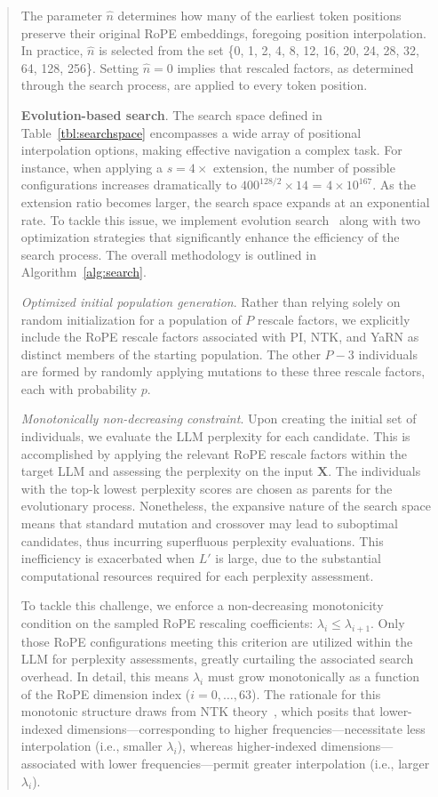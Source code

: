 \begin{abstract}
The parameter $\hat{n}$ determines how many of the earliest token positions preserve their original RoPE embeddings, foregoing position interpolation. In practice, $\hat{n}$ is selected from the set \{0, 1, 2, 4, 8, 12, 16, 20, 24, 28, 32, 64, 128, 256\}. Setting $\hat{n}=0$ implies that rescaled factors, as determined through the search process, are applied to every token position.

\textbf{Evolution-based search}. The search space defined in Table~\ref{tbl:searchspace} encompasses a wide array of positional interpolation options, making effective navigation a complex task. For instance, when applying a $s=4\times$ extension, the number of possible configurations increases dramatically to $400^{128/2}\times14$ = $4\times10^{167}$. As the extension ratio becomes larger, the search space expands at an exponential rate. To tackle this issue, we implement evolution search~\cite{guo2020single} along with two optimization strategies that significantly enhance the efficiency of the search process. The overall methodology is outlined in Algorithm~\ref{alg:search}.

\textit{Optimized initial population generation}. Rather than relying solely on random initialization for a population of $P$ rescale factors, we explicitly include the RoPE rescale factors associated with PI, NTK, and YaRN as distinct members of the starting population. The other $P-3$ individuals are formed by randomly applying mutations to these three rescale factors, each with probability $p$.

\textit{Monotonically non-decreasing constraint}. Upon creating the initial set of individuals, we evaluate the LLM perplexity for each candidate. This is accomplished by applying the relevant RoPE rescale factors within the target LLM and assessing the perplexity on the input $\mathbf{X}$. The individuals with the top-k lowest perplexity scores are chosen as parents for the evolutionary process. Nonetheless, the expansive nature of the search space means that standard mutation and crossover may lead to suboptimal candidates, thus incurring superfluous perplexity evaluations. This inefficiency is exacerbated when $L'$ is large, due to the substantial computational resources required for each perplexity assessment.

To tackle this challenge, we enforce a non-decreasing monotonicity condition on the sampled RoPE rescaling coefficients: $\lambda_i\le \lambda_{i+1}$. Only those RoPE configurations meeting this criterion are utilized within the LLM for perplexity assessments, greatly curtailing the associated search overhead. In detail, this means $\lambda_i$ must grow monotonically as a function of the RoPE dimension index ($i=0, \ldots, 63$). The rationale for this monotonic structure draws from NTK theory~\cite{jacot2018neural,tancik2020fourier,ntk}, which posits that lower-indexed dimensions—corresponding to higher frequencies—necessitate less interpolation (i.e., smaller $\lambda_i$), whereas higher-indexed dimensions—associated with lower frequencies—permit greater interpolation (i.e., larger $\lambda_i$).


\end{abstract}
